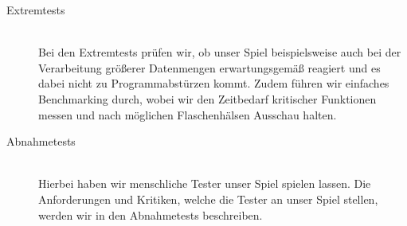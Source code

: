 \begin{description}
	
	\item[Extremtests] \hfill
	\\
	
	Bei den Extremtests prüfen wir, ob unser Spiel beispielsweise auch bei der Verarbeitung größerer Datenmengen erwartungsgemäß reagiert und es dabei nicht zu Programmabstürzen kommt. Zudem führen wir einfaches Benchmarking durch, wobei wir den Zeitbedarf kritischer Funktionen messen und nach möglichen Flaschenhälsen Ausschau halten.


	\item[Abnahmetests] \hfill
	\\
	
	Hierbei haben wir menschliche Tester unser Spiel spielen lassen. Die Anforderungen und Kritiken, welche die Tester  an unser Spiel stellen, werden wir in den Abnahmetests beschreiben. 
		
\end{description}







